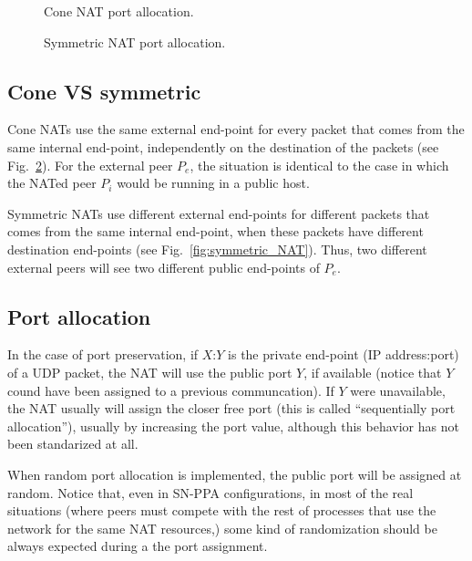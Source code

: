 \begin{figure}
  \caption{Cone NAT port allocation.} %
  \label{fig:cone_NAT}
\end{figure}

\begin{figure}
  \caption{Symmetric NAT port allocation.} %
  \label{fig:cone_NAT}
\end{figure}

\subsection{Cone VS symmetric}
Cone NATs use the same external end-point for every packet that comes
from the same internal end-point, independently on the destination of
the packets (see Fig.~\ref{fig:cone_NAT}). For the external peer
$P_e$, the situation is identical to the case in which the NATed peer
$P_i$ would be running in a public host.

Symmetric NATs use different external end-points for different packets
that comes from the same internal end-point, when these packets have
different destination end-points (see
Fig.~\ref{fig:symmetric_NAT}). Thus, two different external peers will
see two different public end-points of $P_e$.

\subsection{Port allocation}
In the case of port preservation, if $X$:$Y$ is the private end-point
(IP address:port) of a UDP packet, the NAT will use the public port
$Y$, if available (notice that $Y$ cound have been assigned to a
previous communcation). If $Y$ were unavailable, the NAT usually will
assign the closer free port (this is called ``sequentially port
allocation''), usually by increasing the port value, although this
behavior has not been standarized at all.

When random port allocation is implemented, the public port will be
assigned at random. Notice that, even in SN-PPA configurations, in
most of the real situations (where peers must compete with the rest of
processes that use the network for the same NAT resources,) some kind
of randomization should be always expected during a the port
assignment.

